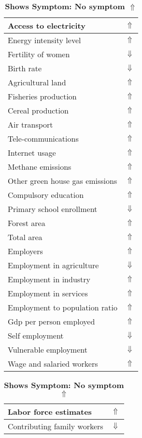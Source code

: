 \documentclass[12pt,notitlepage,oneside]{report}
\begin{document}
\begin{table}[!htb]
\caption{\textbf{Shows Symptom: No symptom $\Uparrow$}}
\centering
\label{Correlated Socio-economic Factors0}
\begin{tabular}{|l|l|}
\hline
Access to electricity & $\Uparrow$\\ \hline
Energy intensity level & $\Uparrow$\\ \hline
Fertility of women & $\Downarrow$\\ \hline
Birth rate & $\Downarrow$\\ \hline
Agricultural land & $\Uparrow$\\ \hline
Fisheries production & $\Uparrow$\\ \hline
Cereal production & $\Uparrow$\\ \hline
Air transport  & $\Uparrow$\\ \hline
Tele-communications & $\Uparrow$\\ \hline
Internet usage & $\Uparrow$\\ \hline
Methane emissions & $\Uparrow$\\ \hline
Other green house gas emissions & $\Uparrow$\\ \hline
Compulsory education & $\Uparrow$\\ \hline
Primary school enrollment & $\Downarrow$\\ \hline
Forest area & $\Uparrow$\\ \hline
Total area & $\Uparrow$\\ \hline
Employers & $\Uparrow$\\ \hline
Employment in agriculture & $\Downarrow$\\ \hline
Employment in industry & $\Uparrow$\\ \hline
Employment in services & $\Uparrow$\\ \hline
Employment to population ratio & $\Uparrow$\\ \hline
Gdp per person employed & $\Uparrow$\\ \hline
Self employment & $\Downarrow$\\ \hline
Vulnerable employment & $\Downarrow$\\ \hline
Wage and salaried workers & $\Uparrow$\\ \hline
\end{tabular}
\begin{tabular}{|l|l|}
\hline
Labor force estimates & $\Uparrow$\\ \hline
Contributing family workers & $\Downarrow$\\ \hline

\end{tabular}
\end{table}
\end{document}
